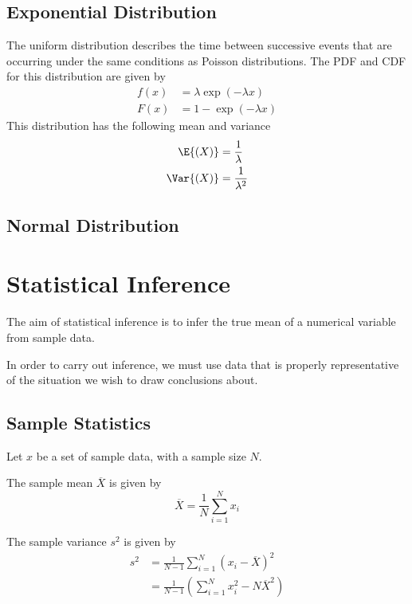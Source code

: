 \documentclass{article}
\begin{document}
\subsection{Exponential Distribution}
The uniform distribution describes the time between successive events that are occurring under the same conditions as Poisson
distributions. The PDF and CDF for this distribution are given by
\begin{align*}
    f(x) & = \lambda \exp{\left( -\lambda x \right)} \\
    F(x) & = 1 - \exp{\left( -\lambda x \right)}
\end{align*}
This distribution has the following mean and variance
\begin{align*}
    \E{\left( X \right)}   & = \frac{1}{\lambda}   \\
    \Var{\left( X \right)} & = \frac{1}{\lambda^2}
\end{align*}
\subsection{Normal Distribution}
\section{Statistical Inference}
The aim of statistical inference is to infer the true mean of a numerical variable from sample data.

In order to carry out inference, we must use data that is properly representative of the situation we wish to draw conclusions about.
\subsection{Sample Statistics}
Let $x$ be a set of sample data, with a sample size $N$.
\begin{theorem}
    The sample mean $\overline{X}$ is given by
    \begin{equation*}
        \overline{X} = \frac{1}{N} \sum_{i = 1}^{N} x_i
    \end{equation*}
\end{theorem}
\begin{theorem}
    The sample variance $s^2$ is given by
    \begin{align*}
        s^2 & = \frac{1}{N - 1} \sum_{i = 1}^{N} \left( x_i - \overline{X} \right)^2     \\
            & = \frac{1}{N - 1} \left( \sum_{i = 1}^{N} x_i^2 - N \overline{X}^2 \right)
    \end{align*}
\end{theorem}
\end{document}
